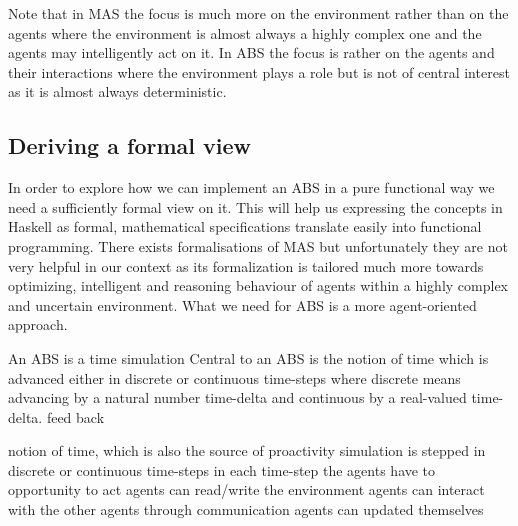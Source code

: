 Note that in MAS the focus is much more on the environment rather than on the agents where the environment is almost always a highly complex one and the agents may intelligently act on it. In ABS the focus is rather on the agents and their interactions where the environment plays a role but is not of central interest as it is almost always deterministic.

\subsection{Deriving a formal view}
In order to explore how we can implement an ABS in a pure functional way we need a sufficiently formal view on it. This will help us expressing the concepts in Haskell as formal, mathematical specifications translate easily into functional programming. There exists formalisations of MAS \cite{wooldridge_introduction_2009} but unfortunately they are not very helpful in our context as its formalization is tailored much more towards optimizing, intelligent and reasoning behaviour of agents within a highly complex and uncertain environment. What we need for ABS is a more agent-oriented approach.

An ABS is a time simulation 
Central to an ABS is the notion of time which is advanced either in discrete or continuous time-steps where discrete means advancing by a natural number time-delta and continuous by a real-valued time-delta. 
feed back

notion of time, which is also the source of proactivity
simulation is stepped in discrete or continuous time-steps
in each time-step the agents have to opportunity to act
agents can read/write the environment
agents can interact with the other agents through communication
agents can updated themselves